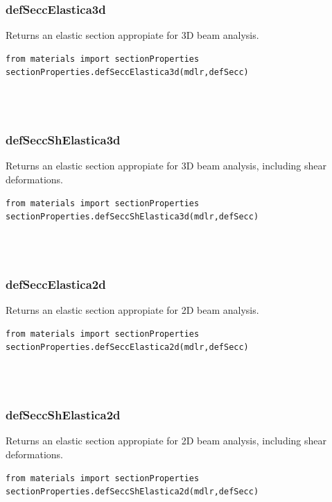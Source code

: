 \subsubsection{defSeccElastica3d}
\noindent Returns an elastic section appropiate for 3D beam analysis.
\begin{verbatim}
from materials import sectionProperties
sectionProperties.defSeccElastica3d(mdlr,defSecc)
\end{verbatim}
\begin{paramFuncTable}
\mdlr{} \\
 \\
\end{paramFuncTable}


\subsubsection{defSeccShElastica3d}
\noindent Returns an elastic section appropiate for 3D beam analysis, including shear deformations.
\begin{verbatim}
from materials import sectionProperties
sectionProperties.defSeccShElastica3d(mdlr,defSecc)
\end{verbatim}
\begin{paramFuncTable}
\mdlr{} \\
 \\
\end{paramFuncTable}


\subsubsection{defSeccElastica2d}
\noindent Returns an elastic section appropiate for 2D beam analysis.
\begin{verbatim}
from materials import sectionProperties
sectionProperties.defSeccElastica2d(mdlr,defSecc)
\end{verbatim}
\begin{paramFuncTable}
\mdlr{} \\
 \\
\end{paramFuncTable}


\subsubsection{defSeccShElastica2d}
\noindent Returns an elastic section appropiate for 2D beam analysis, including shear deformations.
\begin{verbatim}
from materials import sectionProperties
sectionProperties.defSeccShElastica2d(mdlr,defSecc)
\end{verbatim}
\begin{paramFuncTable}
\mdlr{} \\
 \\
\end{paramFuncTable}


